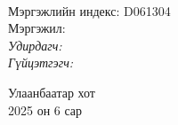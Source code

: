 \begin{titlepage}
\begin{center}

{\scshape\LARGE \univname\par} %
{\scshape\Large \facname\par}\vspace{0.5cm} %

\vspace{2cm}
\hfill \large{\deptname} \\

\vspace{2cm}

{\huge \bfseries \ttitle\par}\vspace{0.4cm} %

\vspace{2cm}

\begin{minipage}[t] {0.9\textwidth}
\begin{flushleft} 
\normalsize

Мэргэжлийн индекс: D061304 \\ 
Мэргэжил: \degreename \\[2cm]

\emph{Удирдагч:} {\supname} \\%
\emph{Гүйцэтгэгч:} {\shortname} \\ %

\end{flushleft}
\end{minipage}

\vfill

\large {Улаанбаатар хот} \\
{\large 2025 он 6 сар}\\ %

\end{center}
\end{titlepage}

 